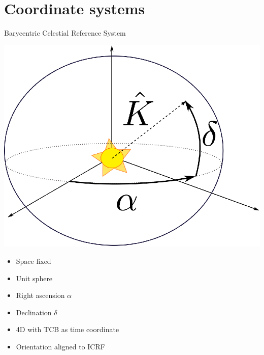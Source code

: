 \documentclass[14pt,table,t, c]{beamer}
\begin{document}
\part{Coordinate systems}

\begin{frame}{Barycentric Celestial Reference System}
\begin{minipage}[t][][c]{0.48\linewidth}
	\includegraphics[width=\linewidth]{figure/bcrs}
\end{minipage}
\begin{minipage}[t][][c]{0.5\linewidth}
\begin{itemize}
\item Space fixed
\item Unit sphere
\item Right ascension $\alpha$
\item Declination $\delta$
\item 4D with TCB as time coordinate
\item Orientation aligned to ICRF
\end{itemize}
\end{minipage}
\end{frame}
\end{document}
